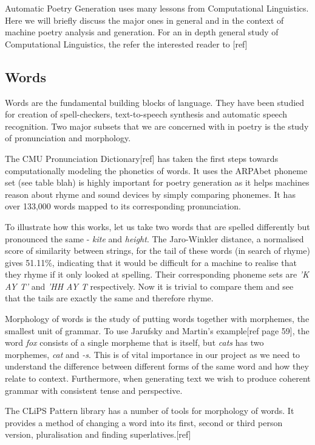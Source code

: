 Automatic Poetry Generation uses many lessons from Computational Linguistics. Here we will briefly discuss the major ones in general and in the context of machine poetry analysis and generation. For an in depth general study of Computational Linguistics, the refer the interested reader to [ref]

\subsection{Words}
Words are the fundamental building blocks of language. They have been studied for creation of spell-checkers, text-to-speech synthesis and automatic speech recognition. Two major subsets that we are concerned with in poetry is the study of pronunciation and morphology. 

The CMU Pronunciation Dictionary[ref] has taken the first steps towards computationally modeling the phonetics of words. It uses the ARPAbet phoneme set (see table blah) is highly important for poetry generation as it helps machines reason about rhyme and sound devices by simply comparing phonemes. It has over 133,000 words mapped to its corresponding pronunciation.

To illustrate how this works, let us take two words that are spelled differently but pronounced the same - \textit{kite} and \textit{height}. The Jaro-Winkler distance, a normalised score of similarity between strings, for the tail of these words (in search of rhyme) gives 51.11\%, indicating that it would be difficult for a machine to realise that they rhyme if it only looked at spelling. Their corresponding phoneme sets are \textit{'K AY T'} and \textit{'HH AY T} respectively. Now it is trivial to compare them and see that the tails are exactly the same and therefore rhyme.

Morphology of words is the study of putting words together with morphemes, the smallest unit of grammar. To use Jarufsky and Martin's example[ref page 59], the word \textit{fox} consists of a single morpheme that is itself, but \textit{cats} has two morphemes, \textit{cat} and \textit{-s}. This is of vital importance in our project as we need to understand the difference between different forms of the same word and how they relate to context. Furthermore, when generating text we wish to produce coherent grammar with consistent tense and perspective.

The CLiPS Pattern library has a number of tools for morphology of words. It provides a method of changing a word into its first, second or third person version, pluralisation and finding superlatives.[ref]

